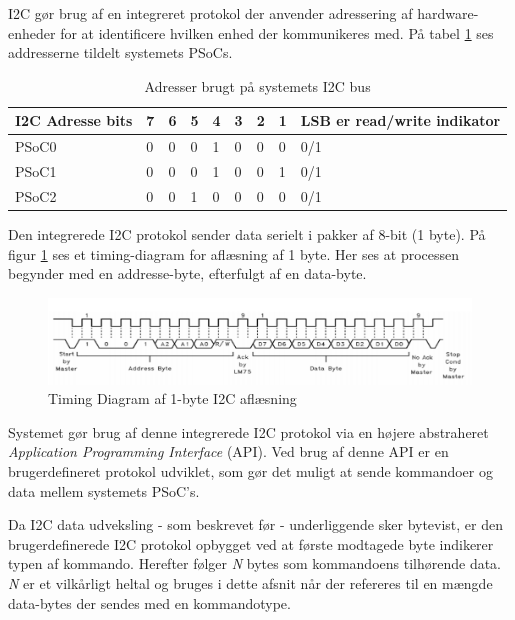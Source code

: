 I2C gør brug af en integreret protokol der anvender adressering af hardware-enheder for at identificere hvilken enhed der kommunikeres med. På tabel \ref{table:I2CAdress} ses addresserne tildelt systemets PSoCs.

\begin{table}[H]
	\centering
	\begin{tabular}{l|lllllll|l}
		\hline
		I2C Adresse bits & 7 & 6 & 5 & 4 & 3 & 2 & 1 & LSB er read/write indikator \\ \hline
		PSoC0        & 0 & 0 & 0 & 1 & 0 & 0 & 0 & 0/1                        \\
		PSoC1        & 0 & 0 & 0 & 1 & 0 & 0 & 1 & 0/1                        \\
		PSoC2        & 0 & 0 & 1 & 0 & 0 & 0 & 0 & 0/1                        \\ \hline
	\end{tabular}
	\caption{Adresser brugt på systemets I2C bus}
	\label{table:I2CAdress}
\end{table}

Den integrerede I2C protokol sender data serielt i pakker af 8-bit (1 byte). På figur \ref{fig:I2CTimingDiagram} ses et timing-diagram for aflæsning af 1 byte. Her ses at processen  begynder med en addresse-byte, efterfulgt af en data-byte. 

\begin{figure}[H]
	\centering
	\includegraphics[width=\textwidth] {Systemarkitektur/images/I2CTimingDiagram}
	\caption{Timing Diagram af 1-byte I2C aflæsning}
	\label{fig:I2CTimingDiagram}
\end{figure}

Systemet gør brug af denne integrerede I2C protokol via en højere abstraheret \textit{Application Programming Interface} (API). Ved brug af denne API er en brugerdefineret protokol udviklet, som gør det muligt at sende kommandoer og data mellem systemets PSoC's.

Da I2C data udveksling - som beskrevet før - underliggende sker bytevist, er den brugerdefinerede I2C protokol opbygget ved at første modtagede byte indikerer typen af kommando. Herefter følger \textit{N} bytes som kommandoens tilhørende data. \textit{N} er et vilkårligt heltal og bruges i dette afsnit når der refereres til en mængde data-bytes der sendes med en kommandotype.

